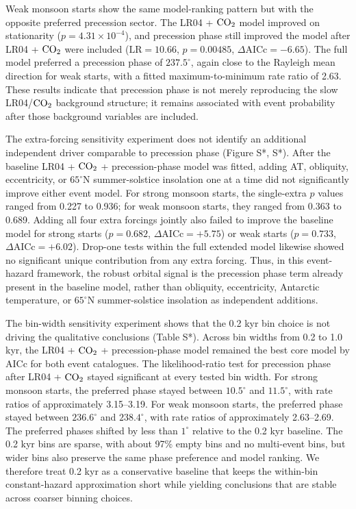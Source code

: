 \documentclass[11pt]{article}
\begin{document}
Weak monsoon starts show the same model-ranking pattern but with the opposite preferred precession sector. The LR04 + \(\ce{CO2}\) model improved on stationarity (\(p=4.31\times10^{-4}\)), and precession phase still improved the model after LR04 + \(\ce{CO2}\) were included (\(\mathrm{LR}=10.66\), \(p=0.00485\), \(\Delta\mathrm{AICc}=-6.65\)). The full model preferred a precession phase of \(237.5^\circ\), again close to the Rayleigh mean direction for weak starts, with a fitted maximum-to-minimum rate ratio of 2.63. These results indicate that precession phase is not merely reproducing the slow LR04/\(\ce{CO2}\) background structure; it remains associated with event probability after those background variables are included. 


The extra-forcing sensitivity experiment does not identify an additional independent driver comparable to precession phase (Figure S*, S*). After the baseline LR04 + \(\ce{CO2}\) + precession-phase model was fitted, adding AT, obliquity, eccentricity, or \(65^\circ\)N summer-solstice insolation one at a time did not significantly improve either event model. For strong monsoon starts, the single-extra \(p\) values ranged from 0.227 to 0.936; for weak monsoon starts, they ranged from 0.363 to 0.689. Adding all four extra forcings jointly also failed to improve the baseline model for strong starts (\(p=0.682\), \(\Delta\mathrm{AICc}=+5.75\)) or weak starts (\(p=0.733\), \(\Delta\mathrm{AICc}=+6.02\)). Drop-one tests within the full extended model likewise showed no significant unique contribution from any extra forcing. Thus, in this event-hazard framework, the robust orbital signal is the precession phase term already present in the baseline model, rather than obliquity, eccentricity, Antarctic temperature, or \(65^\circ\)N summer-solstice insolation as independent additions.

The bin-width sensitivity experiment shows that the 0.2 kyr bin choice is not driving the qualitative conclusions (Table S*). Across bin widths from 0.2 to 1.0 kyr, the LR04 + \(\ce{CO2}\) + precession-phase model remained the best core model by AICc for both event catalogues. The likelihood-ratio test for precession phase after LR04 + \(\ce{CO2}\) stayed significant at every tested bin width. For strong monsoon starts, the preferred phase stayed between \(10.5^\circ\) and \(11.5^\circ\), with rate ratios of approximately 3.15--3.19. For weak monsoon starts, the preferred phase stayed between \(236.6^\circ\) and \(238.4^\circ\), with rate ratios of approximately 2.63--2.69. The preferred phases shifted by less than \(1^\circ\) relative to the 0.2 kyr baseline. The 0.2 kyr bins are sparse, with about 97\% empty bins and no multi-event bins, but wider bins also preserve the same phase preference and model ranking. We therefore treat 0.2 kyr as a conservative baseline that keeps the within-bin constant-hazard approximation short while yielding conclusions that are stable across coarser binning choices.
\end{document}
